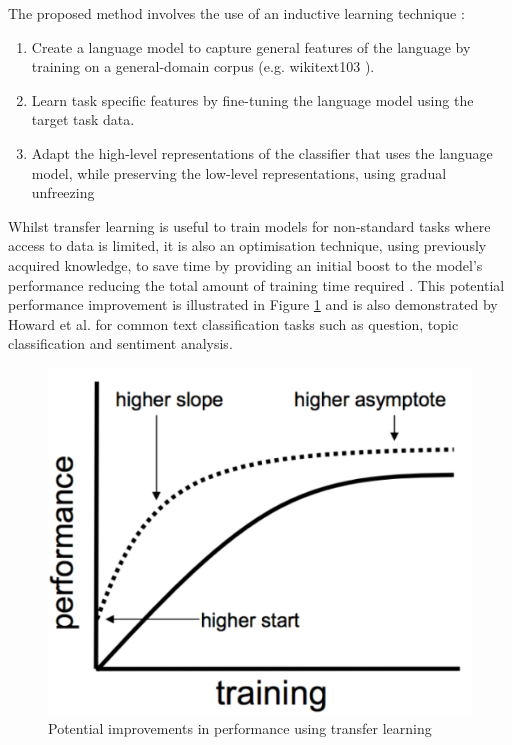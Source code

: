 \documentclass[a4paper,twoside,phd]{BYUPhys}
\begin{document}
The proposed method involves the use of an inductive learning technique \cite{Pan2009}:
\begin{enumerate}
	\item Create a language model to capture general features of the language by training on a general-domain corpus (e.g. wikitext103 \cite{Merity2016}).
	\item Learn task specific features by fine-tuning the language model using the target task data.
	\item Adapt the high-level representations of the classifier that uses the language model, while preserving the low-level representations, using gradual unfreezing \cite{Howard2018}
\end{enumerate}

Whilst transfer learning is useful to train models for non-standard tasks where access to data is limited, it is also an optimisation technique, using previously acquired knowledge, to save time by providing an initial boost to the model's performance reducing the total amount of training time required \cite{Pan2009}. This potential performance improvement is illustrated in Figure \ref{fig:TransferLearning} and is also demonstrated by Howard et al. \cite{Howard2018} for common text classification tasks such as question, topic  classification and sentiment analysis.

\begin{figure}[H]
	\centering
	\includegraphics[totalheight=7cm]{images/transfer-learning.png}
	\caption{Potential improvements in performance using transfer learning \cite{Browniee2017}}
	\label{fig:TransferLearning}
\end{figure}
\end{document}
